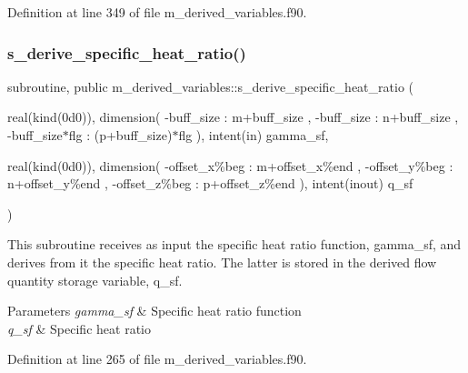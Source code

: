 Definition at line 349 of file m\+\_\+derived\+\_\+variables.\+f90.

\mbox{\label{namespacem__derived__variables_aab235aa45c622ecf7f387cbf7994387d}} 
\subsubsection{\texorpdfstring{s\+\_\+derive\+\_\+specific\+\_\+heat\+\_\+ratio()}{s\_derive\_specific\_heat\_ratio()}}
{\footnotesize\ttfamily subroutine, public m\+\_\+derived\+\_\+variables\+::s\+\_\+derive\+\_\+specific\+\_\+heat\+\_\+ratio (\begin{DoxyParamCaption}\item[{real(kind(0d0)), dimension( -\/buff\+\_\+size     \+:  m+buff\+\_\+size       ,                        -\/buff\+\_\+size     \+:  n+buff\+\_\+size       ,                        -\/buff\+\_\+size$\ast$flg \+: (p+buff\+\_\+size)$\ast$flg ), intent(in)}]{gamma\+\_\+sf,  }\item[{real(kind(0d0)), dimension( -\/offset\+\_\+x\%beg \+: m+offset\+\_\+x\%end  ,                        -\/offset\+\_\+y\%beg \+: n+offset\+\_\+y\%end  ,                        -\/offset\+\_\+z\%beg \+: p+offset\+\_\+z\%end ), intent(inout)}]{q\+\_\+sf }\end{DoxyParamCaption})}



This subroutine receives as input the specific heat ratio function, gamma\+\_\+sf, and derives from it the specific heat ratio. The latter is stored in the derived flow quantity storage variable, q\+\_\+sf. 


\begin{DoxyParams}{Parameters}
{\em gamma\+\_\+sf} & Specific heat ratio function \\
\hline
{\em q\+\_\+sf} & Specific heat ratio \\
\hline
\end{DoxyParams}


Definition at line 265 of file m\+\_\+derived\+\_\+variables.\+f90.

\mbox{\label{namespacem__derived__variables_a7fadac6924cf61654373f9f334106001}} 
